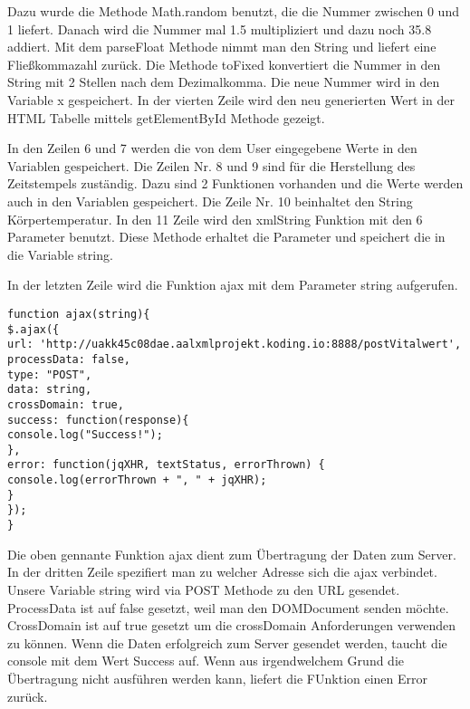 Dazu wurde die Methode Math.random benutzt, die die Nummer zwischen 0 und 1 liefert. Danach wird die Nummer mal 1.5 multipliziert und dazu noch 35.8 addiert. Mit dem parseFloat Methode nimmt man den String und liefert eine Fließkommazahl zurück.  Die Methode toFixed konvertiert die Nummer in den String mit 2 Stellen nach dem Dezimalkomma. Die neue Nummer wird in den Variable x gespeichert. In der vierten Zeile wird den neu generierten Wert in der HTML Tabelle mittels getElementById Methode gezeigt.

In den Zeilen 6 und 7 werden die von dem User eingegebene Werte in den Variablen gespeichert. Die Zeilen Nr. 8 und 9 sind für die Herstellung des Zeitstempels zuständig. Dazu sind 2 Funktionen vorhanden und die Werte werden auch in den Variablen gespeichert. Die Zeile Nr. 10 beinhaltet den String Körpertemperatur. In den 11 Zeile wird den xmlString Funktion mit den 6 Parameter benutzt. Diese Methode erhaltet die Parameter und speichert die in die Variable string.

In der letzten Zeile wird die Funktion ajax mit dem Parameter string aufgerufen.
\\
\begin{lstlisting}
function ajax(string){
$.ajax({
url: 'http://uakk45c08dae.aalxmlprojekt.koding.io:8888/postVitalwert', 
processData: false,
type: "POST",
data: string,
crossDomain: true,
success: function(response){
console.log("Success!");
},
error: function(jqXHR, textStatus, errorThrown) {
console.log(errorThrown + ", " + jqXHR);
}
});
}
\end{lstlisting}

Die oben gennante Funktion ajax dient zum Übertragung der Daten zum Server. In der dritten Zeile spezifiert man zu welcher Adresse sich die ajax verbindet. Unsere Variable string wird via POST Methode zu den URL gesendet. ProcessData ist auf false gesetzt, weil man den DOMDocument senden möchte. CrossDomain ist auf true gesetzt um die crossDomain Anforderungen verwenden zu können. Wenn die Daten erfolgreich zum Server gesendet werden, taucht die console mit dem Wert Success auf. Wenn aus irgendwelchem Grund die Übertragung nicht ausführen werden kann, liefert die FUnktion einen Error zurück.   
     